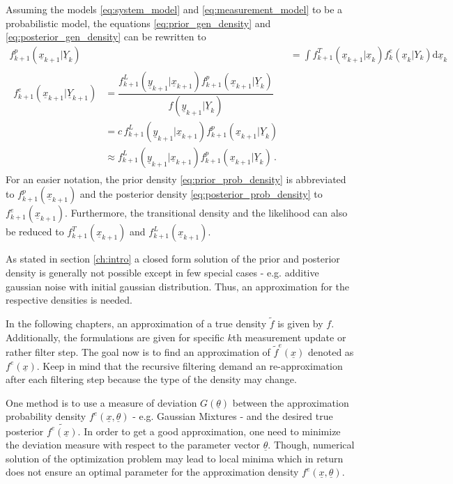 \documentclass[a4paper]{IEEEtran}
\begin{document}
Assuming the models \eqref{eq:system_model} and \eqref{eq:measurement_model} to be a probabilistic model, the equations \eqref{eq:prior_gen_density} and \eqref{eq:posterior_gen_density}
can be rewritten to
\begin{align}
    f^{p}_{k+1}(\underline{x}_{k+1} \vert  \underline{Y}_{k}) &= \int f^{T}_{k+1}(\underline{x}_{k+1} \vert \underline{x}_{k})f^{e}_{k}(\underline{x}_{k} \vert Y_{k})\mathrm{d}\underline{x}_{k} \label{eq:prior_prob_density} \\
    \begin{split}
        f^e_{k+1}(\underline{x}_{k+1} \vert \underline{Y}_{k+1})  &=  \dfrac{f^{L}_{k+1}(\underline{y}_{k+1} \vert \underline{x}_{k+1}) f^{p}_{k+1}(\underline{x}_{k+1} \vert \underline{Y}_{k})}{f(\underline{y}_{k+1} \vert \underline{Y}_{k})} \\
        &= c \, f^{L}_{k+1}(\underline{y}_{k+1} \vert \underline{x}_{k+1}) f^{p}_{k+1}(\underline{x}_{k+1} \vert \underline{Y}_{k}) \\
        &\approx f^{L}_{k+1}(\underline{y}_{k+1} \vert \underline{x}_{k+1}) f^{p}_{k+1}(\underline{x}_{k+1} \vert \underline{Y}_{k})    \,. \label{eq:posterior_prob_density}
    \end{split}
\end{align}    
For an easier notation, the prior density \eqref{eq:prior_prob_density} is abbreviated to $f^{p}_{k+1}(\underline{x}_{k+1})$ and the posterior density \eqref{eq:posterior_prob_density} to $f^e_{k+1}(\underline{x}_{k+1})$. 
Furthermore, the transitional density and the likelihood can also be reduced to $f^{T}_{k+1}(\underline{x}_{k+1})$ and $f^{L}_{k+1}(\underline{x}_{k+1})$.

As stated in section \ref{ch:intro} a closed form solution of the prior and posterior density is generally not possible except in few special cases - e.g. additive gaussian noise with initial gaussian distribution. Thus, an approximation for the 
respective densities is needed. 

In the following chapters, an approximation of a true density $\tilde{f}$ is given by $f$. Additionally, the formulations are given for specific $k$th measurement update or rather filter step. The goal now is to find an approximation of $\tilde{f}^e(\underline{x})$ 
denoted as $f^e(\underline{x})$. Keep in mind that the recursive filtering demand an re-approximation after each filtering step because the type of the density may change. 

One method is to use a measure of deviation $G(\underline{\theta})$ between the approximation probability density 
$f^e(\underline{x}, \underline{\theta})$ - e.g. Gaussian Mixtures - and the desired true posterior $\tilde{f^{e}(\underline{x})}$. In order to get a good approximation, one need to minimize the deviation measure with respect to the 
parameter vector $\underline{\theta}$. Though, numerical solution of the optimization problem may lead to local minima which in return does not ensure an optimal parameter for the 
approximation density $f^e(\underline{x}, \underline{\theta})$. 
\end{document}
